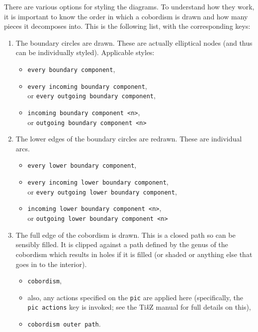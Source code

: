\documentclass{ltxdoc}
\begin{document}
There are various options for styling the diagrams.
To understand how they work, it is important to know the order in which a cobordism is drawn and how many pieces it decomposes into.
This is the following list, with the corresponding keys:

\begin{enumerate}
\item The boundary circles are drawn.
These are actually elliptical nodes (and thus can be individually styled).
Applicable styles:

\begin{itemize}
\item \Verb+every boundary component+,
\item \Verb+every incoming boundary component+,\\
or  \Verb+every outgoing boundary component+,
\item \Verb+incoming boundary component <n>+,\\
or \Verb+outgoing boundary component <n>+
\end{itemize}

\item The lower edges of the boundary circles are redrawn.
These are individual arcs.

\begin{itemize}
\item \Verb+every lower boundary component+,
\item \Verb+every incoming lower boundary component+,\\or  \Verb+every outgoing lower boundary component+,
\item \Verb+incoming lower boundary component <n>+,\\or \Verb+outgoing lower boundary component <n>+
\end{itemize}

\item The full edge of the cobordism is drawn.
This is a closed path so can be sensibly filled.
It is clipped against a path defined by the genus of the cobordism which results in holes if it is filled (or shaded or anything else that goes in to the interior).

\begin{itemize}
\item \Verb+cobordism+,
\item also, any actions specified on the \Verb+pic+ are applied here (specifically, the \Verb+pic actions+ key is invoked; see the Ti\emph{k}Z manual for full details on this),
\item \Verb+cobordism outer path+.
\end{itemize}


\end{enumerate}
\end{document}
